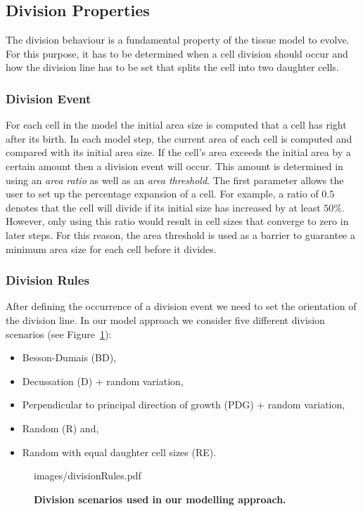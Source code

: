 \documentclass[11pt,a4paper, draft]{article}
\newenvironment{Itemize}{
  \begin{itemize}[leftmargin=0.5cm]{
}}{\end{itemize}}
\begin{document}
\subsection{Division Properties}
\noindent
The division behaviour is a fundamental property of the tissue model to evolve. For this purpose, it has to be determined when a cell division should occur and how the division line has to be set that splits the cell into two daughter cells.

\subsubsection{Division Event}
\noindent
For each cell in the model the initial area size is computed that a cell has right after its birth. In each model step, the current area of each cell is computed and compared with its initial area size. If the cell's area exceeds the initial area by a certain amount then a division event will occur. This amount is determined in using an \textit{area ratio} as well as an \textit{area threshold}. The first parameter allows the user to set up the percentage expansion of a cell. For example, a ratio of $0.5$ denotes that the cell will divide if its initial size has increased by at least $50\%$. However, only using this ratio would result in cell sizes that converge to zero in later steps. For this reason, the area threshold is used as a barrier to guarantee a minimum area size for each cell before it divides.

\subsubsection{Division Rules}
\noindent
After defining the occurrence of a division event we need to set the orientation of the division line. In our model approach we consider five different division scenarios (see Figure~\ref{fig:divisionRules}):
\begin{Itemize}
\item Besson-Dumais (BD),
\item Decussation (D) + random variation,
\item Perpendicular to principal direction of growth (PDG) + random variation,
\item Random (R) and,
\item Random with equal daughter cell sizes (RE).
\end{Itemize}
%
\begin{figure}[htbp]
	\begin{center}
		\begin{overpic}[width=1.\linewidth]{images/divisionRules.pdf}
		\end{overpic}
\caption[Division scenarios used in our modelling approach.]
{
{\bf Division scenarios used in our modelling approach.}
}
	\label{fig:divisionRules}
	\end{center}
\end{figure}
%
\end{document}
